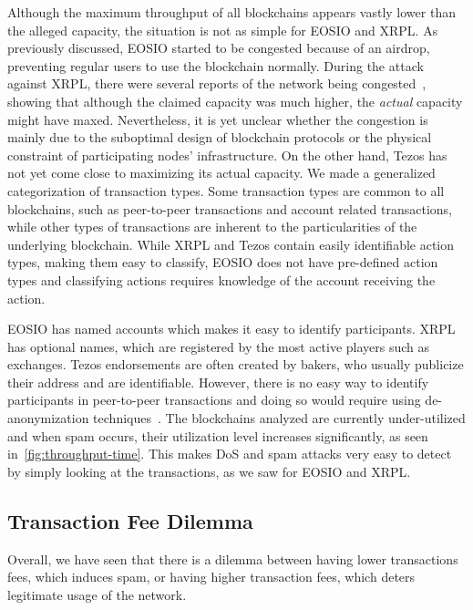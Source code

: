 Although the maximum throughput of all blockchains appears vastly lower than the alleged capacity, the situation is not as simple for EOSIO and XRPL. As previously discussed, EOSIO started to be congested because of an airdrop, preventing regular users to use the blockchain normally.
During the attack against XRPL, there were several reports of the network being congested~\cite{AtoZMarkets2019, Tulo2019}, showing that although the claimed capacity was much higher, the {\em actual} capacity might have maxed. Nevertheless, it is yet unclear whether the congestion is mainly due to the suboptimal design of blockchain protocols or the physical constraint of participating nodes' infrastructure. 
On the other hand, Tezos has not yet come close to maximizing its actual capacity.
We made a generalized categorization of transaction types.
Some transaction types are common to all blockchains, such as peer-to-peer transactions and account related transactions, while other types of transactions are inherent to the particularities of the underlying blockchain. While XRPL and Tezos contain easily identifiable action types, making them easy to classify, EOSIO does not have pre-defined action types and classifying actions requires knowledge of the account receiving the action.

EOSIO has named accounts which makes it easy to identify participants.
XRPL has optional names, which are registered by the most active players such as exchanges.
Tezos endorsements are often created by bakers, who usually publicize their address and are identifiable. However, there is no easy way to identify participants in peer-to-peer transactions and doing so would require using de-anonymization techniques~\cite{10.1145/2660267.2660379,8802640}.
The blockchains analyzed are currently under-utilized and when spam occurs, their utilization level increases significantly, as seen in~\autoref{fig:throughput-time}. This makes DoS and spam attacks very easy to detect by simply looking at the transactions, as we saw for EOSIO and XRPL.

\subsection{Transaction Fee Dilemma}
Overall, we have seen that there is a dilemma between having lower transactions fees, which induces spam, or having higher transaction fees, which deters legitimate usage of the network.

